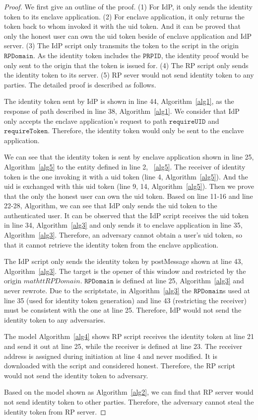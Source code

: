 \begin{proof}
We first give an outline of the proof. (1) For IdP, it only sends the identity token to its enclave application. (2) For enclave application, it only returns the token back to whom invoked it with the uid token. And it can be proved that only the honest user can own the uid token beside of enclave application and IdP server. (3) The IdP script only transmits the token to the script in the origin $\mathtt{RPDomain}$. As the identity token includes the $\mathtt{PRPID}$, the identity proof would be only sent to the origin that the token is issued for. (4) The RP script only sends the identity token to its server. (5) RP sever would not send identity token to any parties.
The detailed proof is described as follows. 

The identity token sent by IdP is shown in line 44, Algorithm~\ref{alg1}, as the response of path described in line 38, Algorithm~\ref{alg1}. We consider that IdP only accepts the enclave application's request to path $\mathtt{requireUID}$ and $\mathtt{requireToken}$. Therefore, the identity token would only be sent to the enclave application.

We can see that the identity token is sent by enclave application shown in line 25, Algorithm~\ref{alg5} to the entity defined in line 2, ~\ref{alg5}. The receiver of identity token is the one invoking it with a uid token (line 4, Algorithm~\ref{alg5}). And the uid is exchanged with this uid token (line 9, 14, Algorithm~\ref{alg5}). 
Then we prove that the only the honest user can own the uid token. Based on line 11-16 and line 22-28, Algorithm, we can see that IdP only sends the uid token to the authenticated user. It can be observed that the IdP script receives the uid token in line 34, Algorithm~\ref{alg3} and only sends it to enclave application in line 35, Algorithm~\ref{alg3}. Therefore, an adversary cannot obtain a user's uid token, so that it cannot retrieve the identity token from the enclave application.

The IdP script only sends the identity token by postMessage shown at line 43, Algorithm~\ref{alg3}. The target is the opener of this window and restricted by the origin $mathtt{RPDomain}$. $\mathtt{RPDomain}$ is defined at line 25, Algorithm~\ref{alg3} and never rewrote. Due to the scriptstate, in Algorithm~\ref{alg3} the $\mathtt{RPDomain}$s used at line 35 (used for identity token generation) and line 43 (restricting the receiver) must be consistent with the one at line 25. Therefore, IdP would not send the identity token to any adversaries. 

The model Algorithm~\ref{alg4} shows RP script receives the identity token at line 21 and send it out at line 25, while the receiver is defined at line 23. The receiver address is assigned during initiation at line 4 and never modified. It is downloaded with the script and considered honest. Therefore, the RP script would not send the identity token to adversary.

Based on the model shown as Algorithm~\ref{alg2}, we can find that RP server would not send identity token to other parties. Therefore, the adversary cannot steal the identity token from RP server.
\end{proof}

